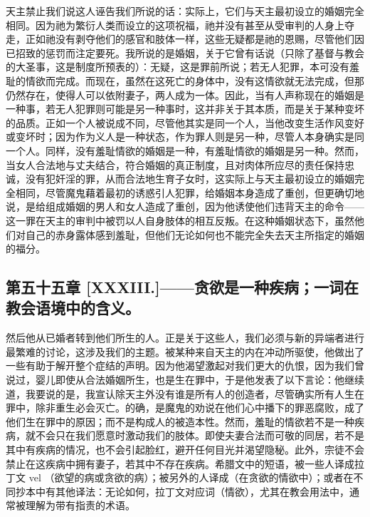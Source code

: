 天主禁止我们说这人诬告我们所说的话：实际上，它们与天主最初设立的婚姻完全相同。因为祂为繁衍人类而设立的这项祝福，祂并没有甚至从受审判的人身上夺走，正如祂没有剥夺他们的感官和肢体一样，这些无疑都是祂的恩赐，尽管他们因已招致的惩罚而注定要死。我所说的是婚姻，关于它曾有话说（只除了基督与教会的大圣事，这是制度所预表的）：无疑，这是罪前所说；若无人犯罪，本可没有羞耻的情欲而完成。而现在，虽然在这死亡的身体中，没有这情欲就无法完成，但那仍然存在，使得人可以依附妻子，两人成为一体。因此，当有人声称现在的婚姻是一种事，若无人犯罪则可能是另一种事时，这并非关于其本质，而是关于某种变坏的品质。正如一个人被说成不同，尽管他其实是同一个人，当他改变生活作风变好或变坏时；因为作为义人是一种状态，作为罪人则是另一种，尽管人本身确实是同一个人。同样，没有羞耻情欲的婚姻是一种，有羞耻情欲的婚姻是另一种。然而，当女人合法地与丈夫结合，符合婚姻的真正制度，且对肉体所应尽的责任保持忠诚，没有犯奸淫的罪，从而合法地生育子女时，这实际上与天主最初设立的婚姻完全相同，尽管魔鬼藉着最初的诱惑引人犯罪，给婚姻本身造成了重创，但更确切地说，是给组成婚姻的男人和女人造成了重创，因为他诱使他们违背天主的命令——这一罪在天主的审判中被罚以人自身肢体的相互反叛。在这种婚姻状态下，虽然他们对自己的赤身露体感到羞耻，但他们无论如何也不能完全失去天主所指定的婚姻的福分。\par


\subsection{第五十五章 [XXXIII.]——贪欲是一种疾病；一词在教会语境中的含义。}

然后他从已婚者转到他们所生的人。正是关于这些人，我们必须与新的异端者进行最繁难的讨论，这涉及我们的主题。被某种来自天主的内在冲动所驱使，他做出了一些有助于解开整个症结的声明。因为他渴望激起对我们更大的仇恨，因为我们曾说过，婴儿即使从合法婚姻所生，也是生在罪中，于是他发表了以下言论：他继续道，我要说的是，我宣认除天主外没有谁是所有人的创造者，尽管确实所有人生在罪中，除非重生必会灭亡。的确，是魔鬼的劝说在他们心中播下的罪恶腐败，成了他们生在罪中的原因；而不是构成人的被造本性。然而，羞耻的情欲若不是一种疾病，就不会只在我们愿意时激动我们的肢体。即使夫妻合法而可敬的同居，若不是其中有疾病的情况，也不会引起脸红，避开任何目光并渴望隐秘。此外，宗徒不会禁止在这疾病中拥有妻子，若其中不存在疾病。希腊文中的短语，被一些人译成拉丁文 vel （欲望的病或贪欲的病）；被另外的人译成（在贪欲的情欲中）；或者在不同抄本中有其他译法：无论如何，拉丁文对应词（情欲），尤其在教会用法中，通常被理解为带有指责的术语。\par

